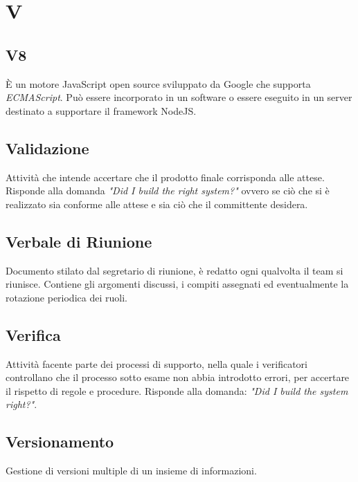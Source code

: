 \section*{V}

\subsection{V8}
È un motore JavaScript open source sviluppato da Google che supporta \textit{ECMAScript}. Può essere incorporato in un software o essere eseguito in un server destinato a supportare il framework NodeJS. 

\subsection{Validazione}
Attività che intende accertare che il prodotto finale corrisponda alle attese. Risponde alla domanda \textit{"Did I build the right system?"} ovvero se ciò che si è realizzato sia conforme alle attese e sia ciò che il committente desidera.

\subsection{Verbale di Riunione}
Documento stilato dal segretario di riunione, è redatto ogni qualvolta il team si riunisce. Contiene gli argomenti discussi, i compiti assegnati ed eventualmente la rotazione periodica dei ruoli.

\subsection{Verifica}
Attività facente parte dei processi di supporto, nella quale i verificatori controllano che il processo sotto esame non abbia introdotto errori, per accertare il rispetto di regole e procedure. Risponde alla domanda: \textit{"Did I build the system right?"}.

\subsection{Versionamento}
Gestione di versioni multiple di un insieme di informazioni.